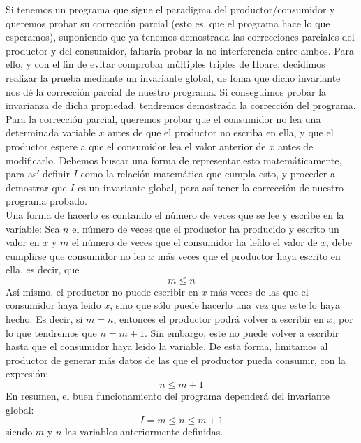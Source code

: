\begin{ejemplo}
    Si tenemos un programa que sigue el paradigma del productor/consumidor y queremos probar su corrección parcial (esto es, que el programa hace lo que esperamos), suponiendo que ya tenemos demostrada las correcciones parciales del productor y del consumidor, faltaría probar la no interferencia entre ambos. Para ello, y con el fin de evitar comprobar múltiples triples de Hoare, decidimos realizar la prueba mediante un invariante global, de foma que dicho invariante nos dé la corrección parcial de nuestro programa. Si conseguimos probar la invarianza de dicha propiedad, tendremos demostrada la corrección del programa.\\

Para la corrección parcial, queremos probar que el consumidor no lea una determinada variable $x$ antes de que el productor no escriba en ella, y que el productor espere a que el consumidor lea el valor anterior de $x$ antes de modificarlo. Debemos buscar una forma de representar esto matemáticamente, para así definir $I$ como la relación matemática que cumpla esto, y proceder a demostrar que $I$ es un invariante global, para así tener la corrección de nuestro programa probado.\\

\noindent
Una forma de hacerlo es contando el número de veces que se lee y escribe en la variable:\newline
Sea $n$ el número de veces que el productor ha producido y escrito un valor en $x$ y $m$ el número de veces que el consumidor ha leído el valor de $x$, debe cumplirse que consumidor no lea $x$ más veces que el productor haya escrito en ella, es decir, que
\begin{equation*}
    m \leq n
\end{equation*}
Así mismo, el productor no puede escribir en $x$ más veces de las que el consumidor haya leido $x$, sino que sólo puede hacerlo una vez que este lo haya hecho. Es decir, si $m = n$, entonces el productor podrá volver a escribir en $x$, por lo que tendremos que $n = m+1$. Sin embargo, este no puede volver a escribir hasta que el consumidor haya leido la variable. De esta forma, limitamos al productor de generar más datos de las que el productor pueda consumir, con la expresión:
\begin{equation*}
    n \leq m+1
\end{equation*}
En resumen, el buen funcionamiento del programa dependerá del invariante global:
\begin{equation*}
    I = m \leq n \leq m+1
\end{equation*}
siendo $m$ y $n$ las variables anteriormente definidas.\\


\end{ejemplo}
